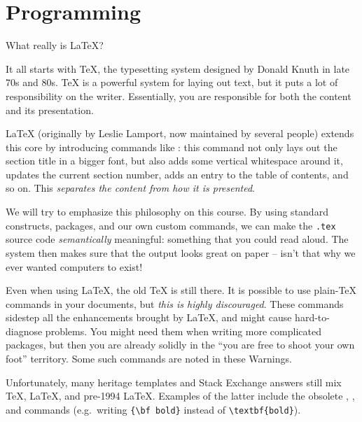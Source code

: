 
\chapter{Programming}

What really is \LaTeX?

It all starts with \TeX, the typesetting system designed by Donald Knuth in late 70s and 80s.
\TeX{} is a powerful system for laying out text,
but it puts a lot of responsibility on the writer.
Essentially, you are responsible for both the content and its presentation.

\LaTeX{} (originally by Leslie Lamport, now maintained by several people)
extends this core by introducing commands like :
this command not only lays out the section title in a bigger font,
but also adds some vertical whitespace around it, updates the current section number,
adds an entry to the table of contents, and so on.
This \emph{separates the content from how it is presented}.

We will try to emphasize this philosophy on this course.
By using standard constructs, packages, and our own custom commands,
we can make the \verb|.tex| source code \emph{semantically} meaningful:
something that you could read aloud.
The system then makes sure that the output looks great on paper
-- isn't that why we ever wanted computers to exist!


\begin{warning}
Even when using \LaTeX{}, the old \TeX{} is still there.
It is possible to use plain-\TeX{} commands in your documents,
but \emph{this is highly discouraged}.
These commands sidestep all the enhancements brought by \LaTeX,
and might cause hard-to-diagnose problems.
You might need them when writing more complicated packages,
but then you are already solidly in the ``you are free to shoot your own foot'' territory.
Some such commands are noted in these Warnings.

Unfortunately, many heritage templates and Stack Exchange answers still mix
\TeX{}, \LaTeX, and pre-1994 \LaTeX.
Examples of the latter include the obsolete , , and  commands
(e.g.\ writing \verb|{\bf bold}| instead of \verb|\textbf{bold}|).
\end{warning}


